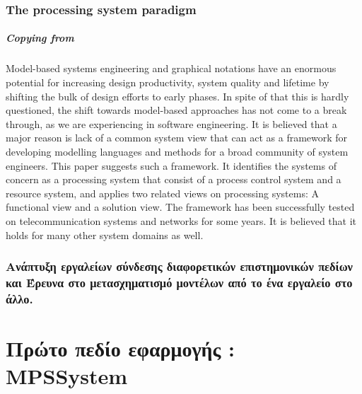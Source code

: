 \documentclass[a4paper,12pt,twoside]{report}
\begin{document}
{		\subsection{The processing system paradigm}
			\paragraph{Copying from \cite{ProcessingSysPar}} {Model-based systems engineering and graphical notations have an enormous potential for increasing design productivity, system quality and lifetime by shifting the bulk of design efforts to early phases. In spite of that this is hardly questioned, the shift towards model-based approaches has not come to a break through, as we are experiencing in software engineering. It is believed that a major reason is lack of a common system view that can act as a framework for developing modelling languages and methods for a broad community of system engineers. This paper suggests such a framework. It identifies the systems of concern as a processing system that consist of a process control system and a resource system, and applies two related views on processing systems: A functional view and a solution view. The framework has been successfully tested on telecommunication systems and networks for some years. It is believed that it holds for many other system domains as well.
			}
			
		\subsection{Ανάπτυξη εργαλείων σύνδεσης διαφορετικών επιστημονικών πεδίων και Έρευνα στο μετασχηματισμό μοντέλων από το ένα εργαλείο στο άλλο.}
		
		
	\chapter{Πρώτο πεδίο εφαρμογής :\\ MPS\textregistered  System}
		\label{κεφ.:Πρώτο πεδίο εφαρμογής : MPS System}

}
\end{document}
